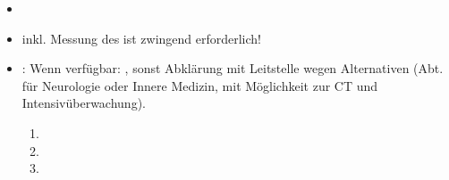 \documentclass[
ngerman,
paper=a4,
asymmetric,
fontsize=9pt,
draft=false,
openany,
numbers=noenddot,
bibtotocnumbered,
footnotes=multiple,
toc=flat,
]{scrbook}
\begin{document}
{\begin{itemize}
\begin{itemize}
\begin{enumerate}
      eines Notarztes erforderlich machen.
      \item Es muss versucht werden, eine Aufnahme auf eine
       für Schlaganfälle zu
      organisieren\footnote{Der Erfolg ist abhängig von der
      Verfügbarkeit eines entsprechenden freien Bettes.} (Stroke Unit,
      Kontaktaufnahme mit der Leitstelle).
      \item Regionale Bestimmungen müssen beachtet werden!
    \end{enumerate}
  \end{itemize}
  \item  {}
  \item {} inkl. Messung des  ist
  zwingend erforderlich!
  \item {}: Wenn verfügbar: , sonst
  Abklärung mit Leitstelle wegen Alternativen (Abt. für
  Neurologie oder Innere Medizin, mit Möglichkeit zur CT und
  Intensivüberwachung).
  \begin{enumerate}
    \item {}
    \item {}
    \item {}
  \end{enumerate}
\end{itemize}



\cite{Aass-1.0var1,AassMk-2013var1,MA70-Protokoll-2012-10-11,AsboeLvWien-2013-01-29,Lang2012,Ma70-Ausrueckordnung-2012-01-24}


}
\end{document}

